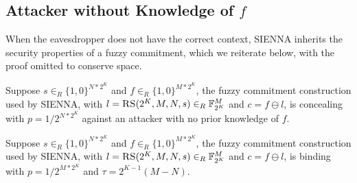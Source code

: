 \subsection{Attacker without Knowledge of $f$}
When the eavesdropper does not have the correct context, SIENNA inherits the security properties of a fuzzy commitment, which we reiterate below, with the proof omitted to conserve space.
\begin{claim}
\label{clm:concealment}
Suppose $s \in_{R} \{1,0\}^{N*{2^K}}$ and $f \in_{R} \{1,0\}^{M*{2^K}}$, the fuzzy commitment construction used by SIENNA, with $l = \textsc{RS}(2^K, M, N, s) \in_{R} \mathbb{F}^M_{2^K}$ and $c = f \ominus l$, is concealing with $p = 1/2^{N*2^K}$ against an attacker with no prior knowledge of $f$.
\end{claim}



\begin{claim}
\label{clm:binding}
Suppose $s \in_{R} \{1,0\}^{N*{2^K}}$ and $f \in_{R} \{1,0\}^{M*{2^K}}$, the fuzzy commitment construction used by SIENNA, with $l = \textsc{RS}(2^K, M, N, s) \in_{R} \mathbb{F}^M_{2^K}$ and $c = f \ominus l$, is binding with $p = 1/2^{M*2^K}$ and $\tau = 2^{K-1}(M-N)$.
\end{claim}

